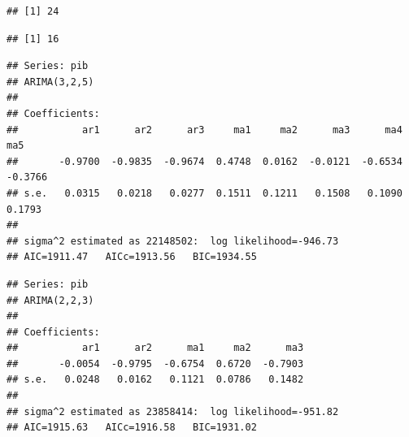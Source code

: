 \documentclass[
]{article}
\newenvironment{Shaded}{\begin{snugshade}}{\end{snugshade}}
\newcommand{\KeywordTok}[1]{\textcolor[rgb]{0.13,0.29,0.53}{\textbf{#1}}}
\newcommand{\NormalTok}[1]{#1}
\newcommand{\OperatorTok}[1]{\textcolor[rgb]{0.81,0.36,0.00}{\textbf{#1}}}
\newcommand{\StringTok}[1]{\textcolor[rgb]{0.31,0.60,0.02}{#1}}
\begin{document}
\begin{Shaded}
\end{Shaded}

\begin{verbatim}
## [1] 24
\end{verbatim}

\begin{Shaded}
\end{Shaded}

\begin{verbatim}
## [1] 16
\end{verbatim}

\begin{Shaded}
\end{Shaded}

\begin{verbatim}
## Series: pib 
## ARIMA(3,2,5) 
## 
## Coefficients:
##           ar1      ar2      ar3     ma1     ma2      ma3      ma4      ma5
##       -0.9700  -0.9835  -0.9674  0.4748  0.0162  -0.0121  -0.6534  -0.3766
## s.e.   0.0315   0.0218   0.0277  0.1511  0.1211   0.1508   0.1090   0.1793
## 
## sigma^2 estimated as 22148502:  log likelihood=-946.73
## AIC=1911.47   AICc=1913.56   BIC=1934.55
\end{verbatim}

\begin{Shaded}
\end{Shaded}

\begin{verbatim}
## Series: pib 
## ARIMA(2,2,3) 
## 
## Coefficients:
##           ar1      ar2      ma1     ma2      ma3
##       -0.0054  -0.9795  -0.6754  0.6720  -0.7903
## s.e.   0.0248   0.0162   0.1121  0.0786   0.1482
## 
## sigma^2 estimated as 23858414:  log likelihood=-951.82
## AIC=1915.63   AICc=1916.58   BIC=1931.02
\end{verbatim}
\end{document}
